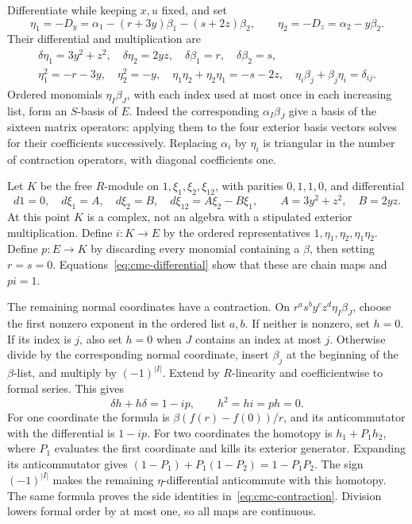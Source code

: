 Differentiate while keeping \(x,u\) fixed, and set
\[
 \eta_1=-D_y=\alpha_1-(r+3y)\beta_1-(s+2z)\beta_2,\qquad
 \eta_2=-D_z=\alpha_2-y\beta_2.
\]
Their differential and multiplication are
\begin{gather}
 \delta\eta_1=3y^2+z^2,\quad \delta\eta_2=2yz,\quad
 \delta\beta_1=r,\quad\delta\beta_2=s,\label{eq:cmc-differential}\\
 \eta_1^2=-r-3y,\quad \eta_2^2=-y,\quad
 \eta_1\eta_2+\eta_2\eta_1=-s-2z,\quad
 \eta_i\beta_j+\beta_j\eta_i=\delta_{ij}.
 \label{eq:cmc-clifford}
\end{gather}
Ordered monomials \(\eta_I\beta_J\), with each index used at most
once in each increasing list, form an \(S\)-basis of \(E\).
Indeed the corresponding \(\alpha_I\beta_J\) give a basis of the
sixteen matrix operators: applying them to the four exterior basis
vectors solves for their coefficients successively. Replacing
\(\alpha_i\) by \(\eta_i\) is triangular in the number of contraction
operators, with diagonal coefficients one.

Let \(K\) be the free \(R\)-module on \(1,\xi_1,\xi_2,\xi_{12}\),
with parities \(0,1,1,0\), and differential
\[
 d1=0,\quad d\xi_1=A,\quad d\xi_2=B,\quad
 d\xi_{12}=A\xi_2-B\xi_1,\qquad
 A=3y^2+z^2,\quad B=2yz.
\]
At this point \(K\) is a complex, not an algebra with a stipulated
exterior multiplication. Define \(i:K\to E\) by the ordered
representatives \(1,\eta_1,\eta_2,\eta_1\eta_2\). Define \(p:E\to K\)
by discarding every monomial containing a \(\beta\), then setting
\(r=s=0\). Equations~\eqref{eq:cmc-differential} show that these are
chain maps and \(pi=1\).

The remaining normal coordinates have a contraction. On
\(r^a s^b y^c z^d\eta_I\beta_J\), choose the first nonzero exponent
in the ordered list \(a,b\). If neither is nonzero, set \(h=0\).
If its index is \(j\), also set \(h=0\) when \(J\) contains an
index at most \(j\). Otherwise divide by the corresponding normal
coordinate, insert \(\beta_j\) at the beginning of the \(\beta\)-list,
and multiply by \((-1)^{|I|}\). Extend by \(R\)-linearity and
coefficientwise to formal series. This gives
\begin{equation}\label{eq:cmc-contraction}
 \delta h+h\delta=1-ip,\qquad h^2=hi=ph=0.
\end{equation}
For one coordinate the formula is
\(\beta(f(r)-f(0))/r\), and its anticommutator with the differential
is \(1-ip\). For two coordinates the homotopy is
\(h_1+P_1h_2\), where \(P_1\) evaluates the first coordinate and
kills its exterior generator. Expanding its anticommutator gives
\((1-P_1)+P_1(1-P_2)=1-P_1P_2\).
The sign \((-1)^{|I|}\) makes the remaining \(\eta\)-differential
anticommute with this homotopy. The same formula proves the side
identities in~\eqref{eq:cmc-contraction}. Division lowers formal
order by at most one, so all maps are continuous.

